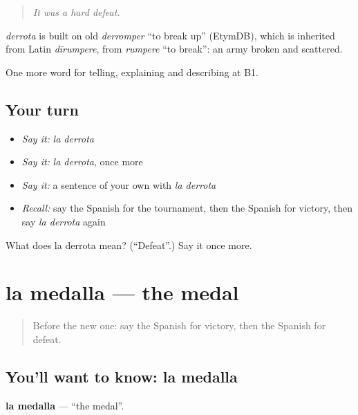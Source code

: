 \begin{quote}
\emph{It was a hard defeat.}
\end{quote}

\begin{cousinweb}
\emph{derrota} is built on old \emph{derromper} \textquotedblleft{}to break up\textquotedblright{} (EtymDB), which is inherited from Latin \emph{dīrumpere}, from \emph{rumpere} \textquotedblleft{}to break\textquotedblright{}: an army broken and scattered.
\end{cousinweb}

\begin{grammarlens}[title={What you've built}]
One more word for telling, explaining and describing at B1.
\end{grammarlens}

\subsection*{Your turn}
\begin{itemize}
\raggedright
  \item \emph{Say it:} \emph{la derrota}
  \item \emph{Say it:} \emph{la derrota}, once more
  \item \emph{Say it:} a sentence of your own with \emph{la derrota}
  \item \emph{Recall:} say the Spanish for the tournament, then the Spanish for victory, then say \emph{la derrota} again
\end{itemize}

\begin{tcolorbox}[breakable,colback=teal!4,colframe=teal!35!black,title={Before you move on}]
What does la derrota mean? (\textquotedblleft{}Defeat\textquotedblright{}.) Say it once more.
\end{tcolorbox}
\section[la medalla]{la medalla — the medal}

\label{lesson:ES-C757-medalla}



\begin{quote}
Before the new one: say the Spanish for victory, then the Spanish for defeat.
\end{quote}

\subsection*{You'll want to know: la medalla}
\textbf{la medalla} — \textquotedblleft{}the medal\textquotedblright{}.

